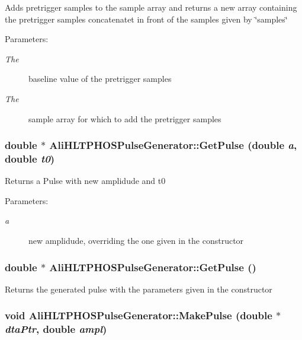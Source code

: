 Adds pretrigger samples to the sample array and returns a new array containing the pretrigger samples concatenatet in front of the samples given by \char`\"{}samples\char`\"{} \begin{Desc}
\item[Parameters:]
\begin{description}
\item[{\em The}]baseline value of the pretrigger samples \item[{\em The}]sample array for which to add the pretrigger samples \end{description}
\end{Desc}
\subsubsection{\setlength{\rightskip}{0pt plus 5cm}double $\ast$ Ali\-HLTPHOSPulse\-Generator::Get\-Pulse (double {\em a}, double {\em t0})}\label{classAliHLTPHOSPulseGenerator_a10}


Returns a Pulse with new amplidude and t0 \begin{Desc}
\item[Parameters:]
\begin{description}
\item[{\em a}]new amplidude, overriding the one given in the constructor \end{description}
\end{Desc}
\subsubsection{\setlength{\rightskip}{0pt plus 5cm}double $\ast$ Ali\-HLTPHOSPulse\-Generator::Get\-Pulse ()}\label{classAliHLTPHOSPulseGenerator_a9}


Returns the generated pulse with the parameters given in the constructor 
\subsubsection{\setlength{\rightskip}{0pt plus 5cm}void Ali\-HLTPHOSPulse\-Generator::Make\-Pulse (double $\ast$ {\em dta\-Ptr}, double {\em ampl})\hspace{0.3cm}{\tt  [private]}}\label{classAliHLTPHOSPulseGenerator_d1}


